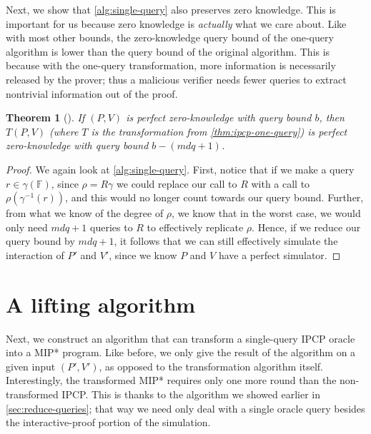 \documentclass[english,12pt]{reedthesis}
\theoremstyle{plain}
\newtheorem{thm}{Theorem}[section]
\theoremstyle{definition}
\theoremstyle{remark}
\begin{document}
Next, we show that \cref{alg:single-query} also preserves zero knowledge. This
is important for us because zero knowledge is \emph{actually} what we care
about. Like with most other bounds, the zero-knowledge query bound of the
one-query algorithm is lower than the query bound of the original algorithm.
This is because with the one-query transformation, more information is
necessarily released by the prover; thus a malicious verifier needs fewer
queries to extract nontrivial information out of the proof.

\begin{thm}[{\cite[Prop.\ 9.2]{CFGS22}}]\label{thm:one-query-pzk}
  If $(P, V)$ is perfect zero-knowledge with query bound $b$, then $T(P, V)$
  (where $T$ is the transformation from \cref{thm:ipcp-one-query}) is perfect
  zero-knowledge with query bound $b - (mdq + 1)$.
\end{thm}

\begin{proof}
  We again look at \cref{alg:single-query}. First, notice that if we make a
  query $r \in \gamma(\mathbb{F})$, since $\rho = R\gamma$ we could replace our call to $R$
  with a call to $\rho(\gamma^{-1}(r))$, and this would no longer count towards our
  query bound. Further, from what we know of the degree of $\rho$, we know that in
  the worst case, we would only need $mdq + 1$ queries to $R$ to effectively
  replicate $\rho$. Hence, if we reduce our query bound by $mdq + 1$, it follows
  that we can still effectively simulate the interaction of $P'$ and $V'$, since
  we know $P$ and $V$ have a perfect simulator.
\end{proof}

\section{A lifting algorithm}\label{sec:lift-ipcp-mip}

Next, we construct an algorithm that can transform a single-query IPCP oracle
into a MIP* program. Like before, we only give the result of the algorithm on a
given input $(P', V')$, as opposed to the transformation algorithm itself.
Interestingly, the transformed MIP* requires only one more round than the
non-transformed IPCP\@. This is thanks to the algorithm we showed earlier in
\cref{sec:reduce-queries}; that way we need only deal with a single oracle query
besides the interactive-proof portion of the simulation.
\end{document}
